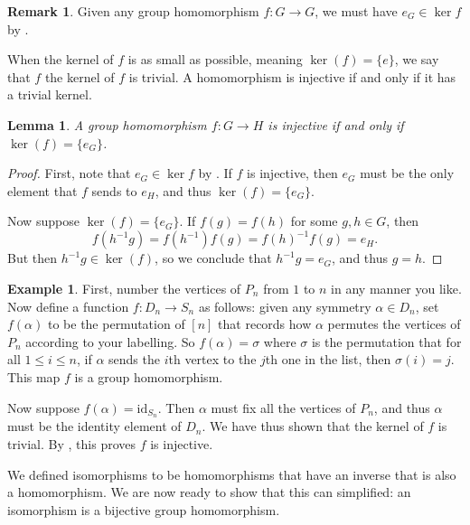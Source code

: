 \documentclass[12pt]{report}
\newtheorem{lemma}[theorem]{Lemma}
\numberwithin{equation}{section}
\numberwithin{theorem}{chapter}
\theoremstyle{definition}
\newtheorem{example}[theorem]{Example}
\newtheorem*{basic properties}{Basic Properties}
\newtheorem*{Important Remark}{Important Remark}
\newtheorem{remark}[theorem]{Remark}
\renewcommand{\ker}{\operatorname{ker}}
\begin{document}
\begin{remark}
Given any group homomorphism $f\!: G \longrightarrow G$, we must have $e_G \in \ker f$ by .
\end{remark}

When the kernel of $f$ is as small as possible, meaning $\ker (f) = \{ e \}$, we say that $f$ the kernel of $f$ is trivial.
A homomorphism is injective if and only if it has a trivial kernel.

\begin{lemma}\label{injective homomorphism iff ker trivial}
A group homomorphism $f: G \to H$ is injective if and only if $\ker(f) = \{e_G\}$.
\end{lemma}

\begin{proof} 
First, note that $e_G \in \ker f$ by . If $f$ is injective, then $e_G$ must be the only element that $f$ sends to $e_H$, and thus $\ker(f) = \{ e_G \}$.
 
Now suppose $\ker(f) = \{e_G\}$. If $f(g) = f(h)$ for some $g,h \in G$, then 
$$f(h^{-1}g) = f(h^{-1})f(g) = f(h)^{-1}f(g) = e_H.$$
But then $h^{-1}g \in \ker(f)$, so we conclude that $h^{-1}g = e_G$, and thus $g = h$.
\end{proof}



\begin{example} 
First, number the vertices of $P_n$ from $1$ to $n$ in any manner you like. Now define a function $f\!: D_{n} \to S_n$ as follows: given any symmetry $\alpha \in D_n$, set $f(\alpha)$ to be the permutation of $[n]$ that records how $\alpha$ permutes the vertices of $P_n$ according to your labelling. So $f(\alpha) = \sigma$ where $\sigma$ is the permutation that for all $1 \leqslant i \leqslant n$, if $\alpha$ sends the $i$th vertex to the $j$th one in the list, then $\sigma(i) = j$.
This map $f$ is a group homomorphism. 

Now suppose $f(\alpha) = \mathrm{id}_{S_n}$. Then $\alpha$ must fix all the vertices of $P_n$, and thus $\alpha$ must be the identity element of $D_n$. We have thus shown that the kernel of $f$ is trivial. By , this proves $f$ is injective.
\end{example}


We defined isomorphisms to be homomorphisms that have an inverse that is also a homomorphism. We are now ready to show that this can simplified: an isomorphism is a bijective group homomorphism.
\end{document}
